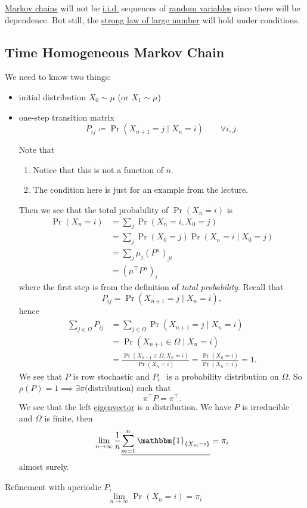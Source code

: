 \begin{note}
	\hyperref[def:Markov-chain]{Markov chains} will not be \hyperref[def:i.i.d.]{i.i.d.} sequences of \hyperref[def:random-variable]{random variables} since there will be dependence. But still, the \hyperref[thm:SLLN]{strong law of large number} will hold under conditions.
\end{note}

\subsection{Time Homogeneous Markov Chain}
We need to know two things:
\begin{itemize}
	\item initial distribution \(X_0 \sim \mu\) (or \(X_1\sim \mu\))
	\item one-step transition matrix
	      \[
		      P_{ij} \coloneqq \Pr(X_{n+1} = j \mid X_n = i)\qquad \forall i, j.
	      \]
	      \begin{note}
		      Note that
		      \begin{enumerate}
			      \item Notice that this is not a function of \(n\).
			      \item The condition here is just for an example from the lecture.
		      \end{enumerate}
	      \end{note}

	      Then we see that the total probability of \(\Pr(X_n = i)\) is
	      \[
		      \begin{split}
			      \Pr(X_n = i) &= \sum_j \Pr(X_n = i, X_0 = j)\\
			      &= \sum_j \Pr(X_0 = j)\Pr(X_n = i  \mid  X_0 = j)\\
			      &=\sum_j \mu_{j} (P^n)_{ji}\\
			      &= (\mu^{\top} P^n)_i
		      \end{split}
	      \]
	      where the first step is from the definition of \emph{total probability}. Recall that
	      \[
		      P_{ij} = \Pr(X_{n+1} = j \mid X_n = i),
	      \]
	      hence
	      \[
		      \begin{split}
			      \sum_{j\in \Omega} P_{ij} &= \sum_{j\in \Omega} \Pr(X_{n+1} = j \mid X_n = i)\\
			      &= \Pr(X_{n+1}\in \Omega \mid X_n = i)\\
			      &= \frac{\Pr(X_{n+1}\in \Omega, X_n = i)}{\Pr(X_n = i)}
			      = \frac{\Pr(X_n = i)}{\Pr(X_n = i)}
			      = 1.
		      \end{split}
	      \]
	      We see that \(P\) is row stochastic and \(P_{i\cdot}\) is a probability distribution on \(\Omega\). So \(\rho(P) = 1\implies \exists  \pi\)(distribution) such that
	      \[
		      \pi^{\top} P = \pi^{\top}.
	      \]
	      We see that the left \hyperref[def:eigenvector]{eigenvector} is a distribution. We have \(P\) is irreducible and \(\Omega\) is finite, then
	      \[
		      \lim_{n\to \infty } \frac{1}{n}\underline{\sum\limits_{m=1}^{n}  \mathbbm{1}_{\left\{ X_m = i \right\} }} = \pi_i
	      \]
	      almost surely.
\end{itemize}

Refinement with aperiodic \(P\),
\[
	\lim_{n\to \infty }\Pr(X_n = i) = \pi_i
\]